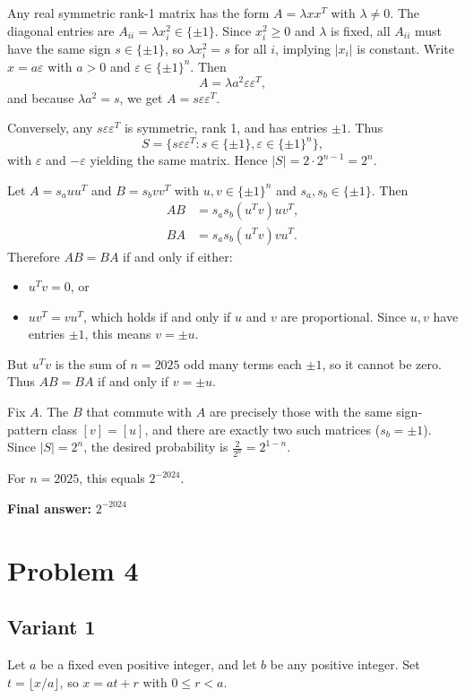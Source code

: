 \documentclass[12pt,a4paper]{article}
\theoremstyle{definition}
\begin{document}
    Any real symmetric rank-1 matrix has the form $A = \lambda xx^T$ with $\lambda \neq 0$. The diagonal entries are $A_{ii} = \lambda x_i^2 \in \{\pm 1\}$. Since $x_i^2 \geq 0$ and $\lambda$ is fixed, all $A_{ii}$ must have the same sign $s \in \{\pm 1\}$, so $\lambda x_i^2 = s$ for all $i$, implying $|x_i|$ is constant. Write $x = a\varepsilon$ with $a > 0$ and $\varepsilon \in \{\pm 1\}^n$. Then
    $$A = \lambda a^2 \varepsilon \varepsilon^T,$$
    and because $\lambda a^2 = s$, we get $A = s \varepsilon \varepsilon^T$.

    Conversely, any $s \varepsilon \varepsilon^T$ is symmetric, rank 1, and has entries $\pm 1$. Thus
    $$S = \{ s \varepsilon \varepsilon^T : s \in \{\pm 1\}, \varepsilon \in \{\pm 1\}^n \},$$
    with $\varepsilon$ and $-\varepsilon$ yielding the same matrix. Hence $|S| = 2 \cdot 2^{n-1} = 2^n$.

    Let $A = s_a u u^T$ and $B = s_b v v^T$ with $u, v \in \{\pm 1\}^n$ and $s_a, s_b \in \{\pm 1\}$. Then
    \begin{align}
        AB &= s_a s_b (u^T v) u v^T, \\
        BA &= s_a s_b (u^T v) v u^T.
    \end{align}
    Therefore $AB = BA$ if and only if either:
    \begin{itemize}
        \item $u^T v = 0$, or
        \item $u v^T = v u^T$, which holds if and only if $u$ and $v$ are proportional. Since $u, v$ have entries $\pm 1$, this means $v = \pm u$.
    \end{itemize}

    But $u^T v$ is the sum of $n = 2025$ odd many terms each $\pm 1$, so it cannot be zero. Thus $AB = BA$ if and only if $v = \pm u$.

    Fix $A$. The $B$ that commute with $A$ are precisely those with the same sign-pattern class $[v] = [u]$, and there are exactly two such matrices ($s_b = \pm 1$). Since $|S| = 2^n$, the desired probability is $\frac{2}{2^n} = 2^{1-n}$.

    For $n = 2025$, this equals $2^{-2024}$.

    \textbf{Final answer:} $2^{-2024}$

    \section{Problem 4}
    \subsection{Variant 1}
    Let $a$ be a fixed even positive integer, and let $b$ be any positive integer. Set
    $t = \lfloor x/a \rfloor$, so $x = at + r$ with $0 \leq r < a$.
\end{document}
